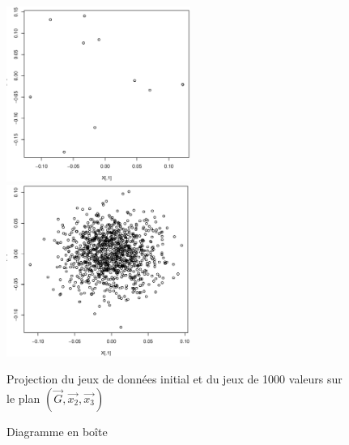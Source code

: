 \documentclass[a4paper]{article}
\begin{document}
\begin{appendices}
\begin{figure}[H]
\includegraphics[width=6cm]{prdata23ex3.eps}\hfill
\includegraphics[width=6cm]{prgener23ex3.eps}
\caption{Projection du jeux de données initial et du jeux de 1000 valeurs sur le plan $(\vec{G},\vec{x_{2}},\vec{x_{3}})$}\label{fig:somefiglabel}
\end{figure}

 \begin{figure}[H] 
    \center 
    \caption{Diagramme en boîte } 
\label{newboxplot}
\end{figure} 








































\end{appendices}
\end{document}
